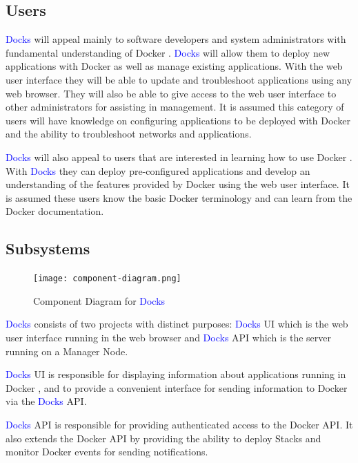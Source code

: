 \documentclass[]{article}
\newcommand{\docks}{\textcolor{Blue}{Docks} }
\newcommand{\docker}{Docker }
\begin{document}
\subsection{Users}
\docks will appeal mainly to software developers and system administrators
with fundamental understanding of \docker. \docks will allow
them to deploy new applications with \docker as well as manage existing 
applications. With the web user interface they will be able to
update and troubleshoot applications using any web browser. They will
also be able to give access to the web user interface to other administrators
for assisting in management. It is assumed this category of users will
have knowledge on configuring applications to be deployed with \docker
and the ability to troubleshoot networks and applications.

\docks will also appeal to users that are interested in learning how
to use \docker. With \docks they can deploy pre-configured applications and
develop an understanding of the features provided by \docker using the 
web user interface. It is assumed these users know the basic \docker
terminology and can learn from the \docker documentation.

\subsection{Subsystems}


\begin{figure}[H]
	\centering
	\texttt{[image: component-diagram.png]}
	\caption{Component Diagram for \docks}
\end{figure}

\docks consists of two projects with distinct purposes:
\docks UI which is the web user interface running in the web browser
and \docks API which is the server running on a Manager Node.

\docks UI is responsible for displaying information about applications running
in \docker, and to provide a convenient interface for sending information
to \docker via the \docks API.

\docks API is responsible for providing authenticated access to the \docker API.
It also extends the \docker API by providing the ability to deploy Stacks
and monitor \docker events for sending notifications.
\end{document}
